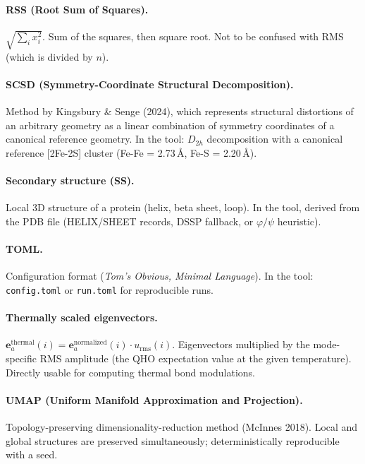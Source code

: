 \documentclass[11pt,a4paper,twoside]{article}
\providecommand{\angstrom}{\text{\AA}}    %
\theoremstyle{remark}
\begin{document}
\paragraph{RSS (Root Sum of Squares).}
$\sqrt{\sum_i x_i^2}$. Sum of the squares, then square root. Not
to be confused with RMS (which is divided by $n$).

\paragraph{SCSD (Symmetry-Coordinate Structural Decomposition).}
Method by Kingsbury \& Senge (2024), which represents structural
distortions of an arbitrary geometry as a linear combination of
symmetry coordinates of a canonical reference geometry. In the
tool: $D_{2h}$ decomposition with a canonical reference [2Fe-2S]
cluster (Fe-Fe = 2.73\,$\angstrom$, Fe-S = 2.20\,$\angstrom$).

\paragraph{Secondary structure (SS).}
Local 3D structure of a protein (helix, beta sheet, loop). In the
tool, derived from the PDB file (HELIX/SHEET records, DSSP
fallback, or $\varphi/\psi$ heuristic).

\paragraph{TOML.}
Configuration format (\emph{Tom's Obvious, Minimal Language}).
In the tool: \texttt{config.toml} or \texttt{run.toml} for
reproducible runs.

\paragraph{Thermally scaled eigenvectors.}
$\mathbf{e}_a^\text{thermal}(i) = \mathbf{e}_a^\text{normalized}(i)
\cdot u_\text{rms}(i)$. Eigenvectors multiplied by the
mode-specific RMS amplitude (the QHO expectation value at the
given temperature). Directly usable for computing thermal bond
modulations.

\paragraph{UMAP (Uniform Manifold Approximation and Projection).}
Topology-preserving dimensionality-reduction method (McInnes 2018).
Local and global structures are preserved simultaneously;
deterministically reproducible with a seed.
\end{document}
